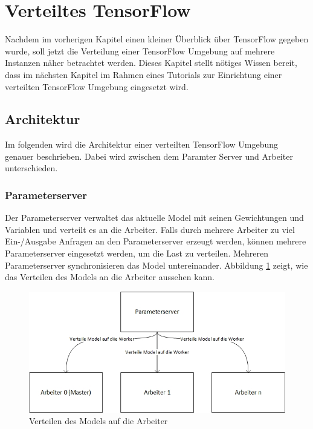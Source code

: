 \section{Verteiltes TensorFlow}
Nachdem im vorherigen Kapitel einen kleiner Überblick über TensorFlow gegeben wurde, soll jetzt die Verteilung einer TensorFlow Umgebung auf mehrere Instanzen näher betrachtet werden. Dieses Kapitel stellt nötiges Wissen bereit, dass im nächsten Kapitel im Rahmen eines Tutorials zur Einrichtung einer verteilten TensorFlow Umgebung eingesetzt wird. 

\subsection{Architektur}
Im folgenden wird die Architektur einer verteilten TensorFlow Umgebung genauer beschrieben. Dabei wird zwischen dem Paramter Server und Arbeiter unterschieden.

\subsubsection{Parameterserver}
Der Parameterserver verwaltet das aktuelle Model mit seinen Gewichtungen und Variablen und verteilt es an die Arbeiter. Falls durch mehrere Arbeiter zu viel Ein-/Ausgabe Anfragen an den Parameterserver erzeugt werden, können mehrere Parameterserver eingesetzt werden, um die Last zu verteilen. Mehreren Parameterserver synchronisieren das Model untereinander. Abbildung \ref{fig:architektur-servemodel} zeigt, wie das Verteilen des Models an die Arbeiter aussehen kann. 

\begin{figure}[h!]
	\centering
	\includegraphics[width=0.9\linewidth]{Pictures/Architektur-ServeModel}
	\caption[Verteilen des Models auf die Arbeiter]{Verteilen des Models auf die Arbeiter}
	\label{fig:architektur-servemodel}
\end{figure}

